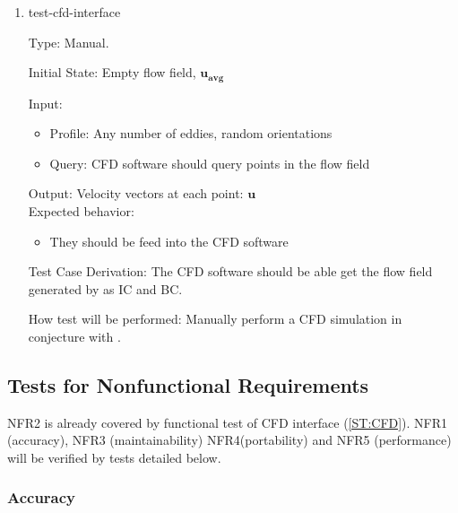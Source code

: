\documentclass[12pt, titlepage]{article}
\begin{document}
\begin{enumerate}

  \item{test-cfd-interface\\}
  
  Type: Manual.
            
  Initial State: Empty flow field, $\mathbf{u_{avg}}$
            
  Input:
  \begin{itemize}
    \item Profile: Any number of eddies, random orientations
    \item Query: CFD software should query points in the flow field
  \end{itemize}
  Output: Velocity vectors at each point: $\mathbf{u}$\\
  Expected behavior:
  \begin{itemize}
    \item They should be feed into the CFD software
  \end{itemize}

  Test Case Derivation: The CFD software should be able get the flow field generated by \progname{} as IC and BC.

  How test will be performed: Manually perform a CFD simulation in conjecture with  \progname{}.
\end{enumerate}

\newpage
\subsection{Tests for Nonfunctional Requirements} \label{NonfuncTest}
NFR2 is already covered by functional test of CFD interface (\ref{ST:CFD}). NFR1 (accuracy), NFR3 (maintainability) NFR4(portability) and NFR5 (performance) will be verified by tests detailed below.



\subsubsection{Accuracy} \label{ST:EddyProf}
\end{document}
